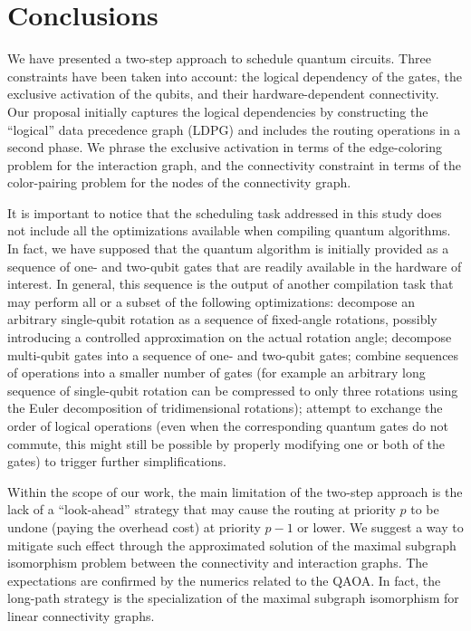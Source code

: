 \documentclass[%
onecolumn,pra,
superscriptaddress,
nofootinbib,
 amsmath,amssymb,
 aps,
11pt,
]{revtex4-1}
\begin{document}
\section{Conclusions}

We have presented a two-step approach to schedule quantum circuits. Three constraints have been taken into account: the logical dependency of the gates, the exclusive activation of the qubits, and their hardware-dependent connectivity. Our proposal initially captures the logical dependencies by constructing the ``logical'' data precedence graph (LDPG) and includes the routing operations in a second phase. We phrase the exclusive activation in terms of the edge-coloring problem for the interaction graph, and the connectivity constraint in terms of the color-pairing problem for the nodes of the connectivity graph.

It is important to notice that the scheduling task addressed in this study does not include all the optimizations available when compiling quantum algorithms. In fact, we have supposed that the quantum algorithm is initially provided as a sequence of one- and two-qubit gates that are readily available in the hardware of interest. In general, this sequence is the output of another compilation task that may perform all or a subset of the following optimizations:
decompose an arbitrary single-qubit rotation as a sequence of fixed-angle rotations, possibly introducing a controlled approximation on the actual rotation angle; decompose multi-qubit gates into a sequence of one- and two-qubit gates; combine sequences of operations into a smaller number of gates (for example an arbitrary long sequence of single-qubit rotation can be compressed to only three rotations using the Euler decomposition of tridimensional rotations); attempt to exchange the order of logical operations (even when the corresponding quantum gates do not commute, this might still be possible by properly modifying one or both of the gates) to trigger further simplifications.

Within the scope of our work, the main limitation of the two-step approach is the lack of a ``look-ahead'' strategy that may cause the routing at priority $p$ to be undone (paying the overhead cost) at priority $p-1$ or lower. We suggest a way to mitigate such effect through the approximated solution of the maximal subgraph isomorphism problem between the connectivity and interaction graphs. The expectations are confirmed by the numerics related to the QAOA. In fact, the long-path strategy is the specialization of the maximal subgraph isomorphism for linear connectivity graphs.
\end{document}
